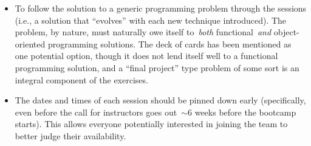 \begin{itemize}
	\item To follow the solution to a generic programming problem through the
	sessions (i.e., a solution that ``evolves'' with each new technique
	introduced).
	The problem, by nature, must naturally owe itself to~\textit{both}
	functional~\textit{and} object-oriented programming solutions.
	The deck of cards has been mentioned as one potential option, though it
	does not lend itself well to a functional programming solution, and a
	``final project'' type problem of some sort is an integral component of
	the exercises.

	\item The dates and times of each session should be pinned down early
	(specifically, even before the call for instructors goes out~$\sim$6 weeks
	before the bootcamp starts).
	This allows everyone potentially interested in joining the team to better
	judge their availability.

\end{itemize}
